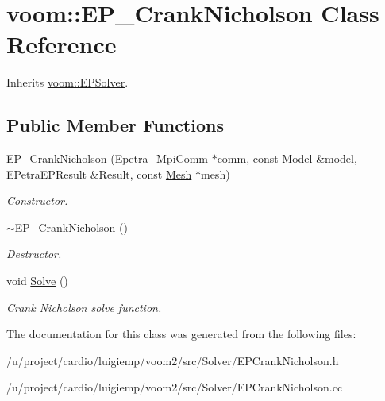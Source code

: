 \hypertarget{classvoom_1_1_e_p___crank_nicholson}{
\section{voom::EP\_\-CrankNicholson Class Reference}
\label{classvoom_1_1_e_p___crank_nicholson}
}


Inherits \hyperlink{classvoom_1_1_e_p_solver}{voom::EPSolver}.\subsection*{Public Member Functions}
\begin{DoxyCompactItemize}
\item 
\hypertarget{classvoom_1_1_e_p___crank_nicholson_ace50b1ad14c5562491db01f2eadcd208}{
\hyperlink{classvoom_1_1_e_p___crank_nicholson_ace50b1ad14c5562491db01f2eadcd208}{EP\_\-CrankNicholson} (Epetra\_\-MpiComm $\ast$comm, const \hyperlink{classvoom_1_1_model}{Model} \&model, EPetraEPResult \&Result, const \hyperlink{classvoom_1_1_mesh}{Mesh} $\ast$mesh)}
\label{classvoom_1_1_e_p___crank_nicholson_ace50b1ad14c5562491db01f2eadcd208}

\begin{DoxyCompactList}\small\item\em Constructor. \item\end{DoxyCompactList}\item 
\hypertarget{classvoom_1_1_e_p___crank_nicholson_a3a535541446828cbbf4b0e1e8823e408}{
\hyperlink{classvoom_1_1_e_p___crank_nicholson_a3a535541446828cbbf4b0e1e8823e408}{$\sim$EP\_\-CrankNicholson} ()}
\label{classvoom_1_1_e_p___crank_nicholson_a3a535541446828cbbf4b0e1e8823e408}

\begin{DoxyCompactList}\small\item\em Destructor. \item\end{DoxyCompactList}\item 
\hypertarget{classvoom_1_1_e_p___crank_nicholson_a6be9e6e44b8fa95b085b661700eded66}{
void \hyperlink{classvoom_1_1_e_p___crank_nicholson_a6be9e6e44b8fa95b085b661700eded66}{Solve} ()}
\label{classvoom_1_1_e_p___crank_nicholson_a6be9e6e44b8fa95b085b661700eded66}

\begin{DoxyCompactList}\small\item\em Crank Nicholson solve function. \item\end{DoxyCompactList}\end{DoxyCompactItemize}


The documentation for this class was generated from the following files:\begin{DoxyCompactItemize}
\item 
/u/project/cardio/luigiemp/voom2/src/Solver/EPCrankNicholson.h\item 
/u/project/cardio/luigiemp/voom2/src/Solver/EPCrankNicholson.cc\end{DoxyCompactItemize}
